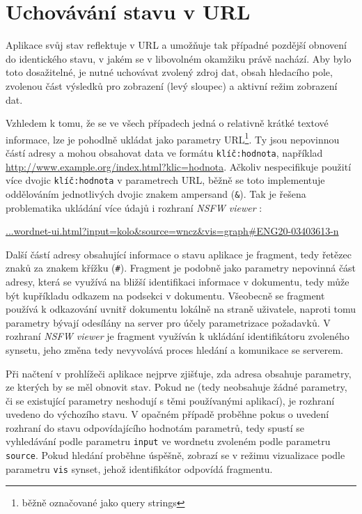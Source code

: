 \documentclass[a4paper, 11pt, oneside]{book}
\newcommand{\simplywn}{\textit{NSFW viewer} }
\begin{document}
			\section{Uchovávání stavu v URL}

				Aplikace svůj stav reflektuje v URL a umožňuje tak případné pozdější obnovení do identického stavu, v jakém se v libovolném okamžiku právě nachází. Aby bylo toto dosažitelné, je nutné uchovávat zvolený zdroj dat, obsah hledacího pole, zvolenou část výsledků pro zobrazení (levý sloupec) a aktivní režim zobrazení dat. 

				Vzhledem k tomu, že se ve všech případech jedná o relativně krátké textové informace, lze je pohodlně ukládat jako parametry URL\footnote{běžně označované jako query strings}. Ty jsou nepovinnou částí adresy a mohou obsahovat data ve formátu \texttt{klíč:hodnota}, například \url{http://www.example.org/index.html?klic=hodnota}. \parencite{berners2005uniform} Ačkoliv \textcite{berners2005uniform} nespecifikuje použití více dvojic \texttt{klíč:hodnota} v parametrech URL, běžně se toto implementuje oddělováním jednotlivých dvojic znakem ampersand (\texttt{\&}). Tak je řešena problematika ukládání více údajů i rozhraní \simplywn: 

				\medskip
				\url{...wordnet-ui.html?input=kolo&source=wncz&vis=graph#ENG20-03403613-n}
				\medskip

				Další částí adresy obsahující informace o stavu aplikace je fragment, tedy řetězec znaků za znakem křížku (\texttt{\#}). Fragment je podobně jako parametry nepovinná část adresy, která se využívá na bližší identifikaci informace v dokumentu, tedy může být kupříkladu odkazem na podsekci v dokumentu. \parencite{berners2005uniform} Všeobecně se fragment používá k odkazování uvnitř dokumentu lokálně na straně uživatele, naproti tomu parametry bývají odesílány na server pro účely parametrizace požadavků. V rozhraní \simplywn je fragment využíván k ukládání identifikátoru zvoleného synsetu, jeho změna tedy nevyvolává proces hledání a komunikace se serverem.

				Při načtení v prohlížeči aplikace nejprve zjišťuje, zda adresa obsahuje parametry, ze kterých by se měl obnovit stav. Pokud ne (tedy neobsahuje žádné parametry, či se existující parametry neshodují s těmi používanými aplikací), je rozhraní uvedeno do výchozího stavu. V opačném případě proběhne pokus o uvedení rozhraní do stavu odpovídajícího hodnotám parametrů, tedy spustí se vyhledávání podle parametru \texttt{input} ve wordnetu zvoleném podle parametru \texttt{source}. Pokud hledání proběhne úspěšně, zobrazí se v režimu vizualizace podle parametru \texttt{vis} synset, jehož identifikátor odpovídá fragmentu.
\end{document}

